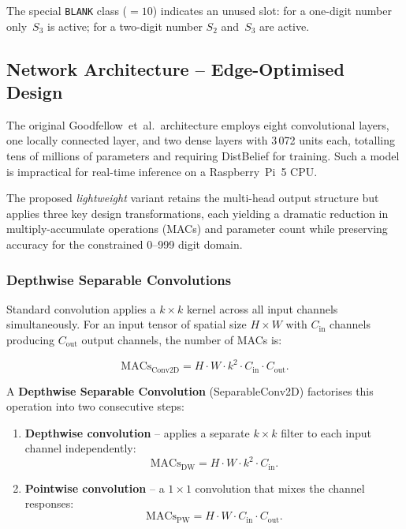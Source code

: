 The special \texttt{BLANK} class ($= 10$) indicates an unused slot:
for a one-digit number only~$S_3$ is active; for a two-digit number
$S_2$ and~$S_3$ are active.

\subsection{Network Architecture -- Edge-Optimised Design}
\label{sec:cnn_arch}

The original Goodfellow~et~al.\ architecture employs eight convolutional layers,
one locally connected layer, and two dense layers with 3\,072 units each,
totalling tens of millions of parameters and requiring DistBelief for training.
Such a model is impractical for real-time inference on a Raspberry~Pi~5 CPU.

The proposed \emph{lightweight} variant retains the multi-head output structure
but applies three key design transformations, each yielding a dramatic reduction in
multiply-accumulate operations (MACs) and parameter count while preserving accuracy
for the constrained 0--999 digit domain.

\subsubsection{Depthwise Separable Convolutions}
\label{sec:separable}

Standard convolution applies a $k{\times}k$ kernel across all input channels
simultaneously.  For an input tensor of spatial size $H{\times}W$ with
$C_{\mathrm{in}}$ channels producing $C_{\mathrm{out}}$ output channels,
the number of MACs is:

\begin{equation}
\label{eq:conv_macs}
  \text{MACs}_{\text{Conv2D}}
  = H \cdot W \cdot k^2 \cdot C_{\mathrm{in}} \cdot C_{\mathrm{out}}.
\end{equation}

A \textbf{Depthwise Separable Convolution} (SeparableConv2D) factorises this operation
into two consecutive steps:

\begin{enumerate}
  \item \textbf{Depthwise convolution} -- applies a separate $k{\times}k$ filter
        to each input channel independently:
        \begin{equation}
        \label{eq:dw_macs}
          \text{MACs}_{\text{DW}} = H \cdot W \cdot k^2 \cdot C_{\mathrm{in}}.
        \end{equation}
  \item \textbf{Pointwise convolution} -- a $1{\times}1$ convolution that mixes
        the channel responses:
        \begin{equation}
        \label{eq:pw_macs}
          \text{MACs}_{\text{PW}} = H \cdot W \cdot C_{\mathrm{in}} \cdot C_{\mathrm{out}}.
        \end{equation}
\end{enumerate}

